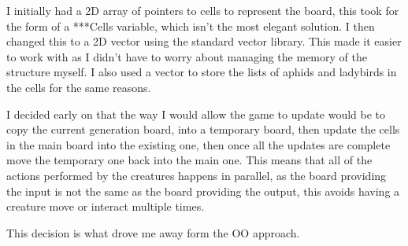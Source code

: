 \documentclass[10pt]{article}
\begin{document}
  I initially had a 2D array of pointers to cells to represent the board, this took for the form of a ***Cells variable, which isn't the most elegant solution. I then changed this to a 2D vector using the standard vector library. This made it easier to work with as I didn't have to worry about managing the memory of the structure myself. I also used a vector to store the lists of aphids and ladybirds in the cells for the same reasons. 

  I decided early on that the way I would allow the game to update would be to copy the current generation board, into a temporary board, then update the cells in the main board into the existing one, then once all the updates are complete move the temporary one back into the main one. This means that all of the actions performed by the creatures happens in parallel, as the board providing the input is not the same as the board providing the output, this avoids having a creature move or interact multiple times. 
  
  This decision is what drove me away form the OO approach.
\end{document}
